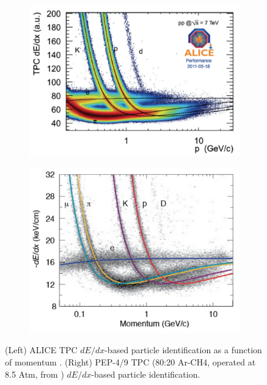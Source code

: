 \begin{figure}[t]
     \centering
     \begin{subfigure}[b]{0.52\textwidth}
         \centering
         \includegraphics[width=\textwidth]{figures/ch3-DUNE/ALICE_TPC_dEdx_Lippmann_2012.png}
         \caption{}
         \label{fig:ALICEPID}
     \end{subfigure}
     \hfill
     \begin{subfigure}[b]{0.47\textwidth}
         \centering
         \includegraphics[width=\textwidth]{figures/ch3-DUNE/PEP4-TPC-80Ar-20CH4-8_5atm_dEdx.png}
         \caption{}
         \label{fig:PEPPID}
     \end{subfigure}
        \caption[ALICE and PEP-4/9 $dE/dx$ PID curves.]{(Left) ALICE TPC $dE/dx$-based particle identification as a function of momentum \cite{Lippmann:2012lwa}. (Right) PEP-4/9 TPC (80:20 Ar-CH4, operated at 8.5 Atm, from \cite{Grupen:1999by}) $dE/dx$-based particle identification. }
        \label{fig:PID}
\end{figure}

